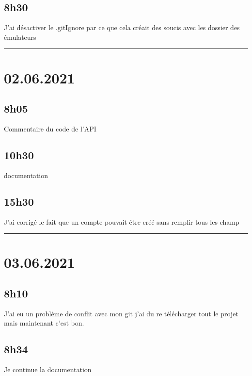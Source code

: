 \documentclass[a4paper,12pt,french]{sphinxmanual}
\begin{document}
\subsection{8h30}
\label{\detokenize{logbook:id181}}
\sphinxAtStartPar
J’ai désactiver le .gitIgnore par ce que cela créait des soucis avec les dossier des émulateurs


\bigskip\hrule\bigskip



\section{02.06.2021}
\label{\detokenize{logbook:id182}}

\subsection{8h05}
\label{\detokenize{logbook:id183}}
\sphinxAtStartPar
Commentaire du code de l’API


\subsection{10h30}
\label{\detokenize{logbook:id184}}
\sphinxAtStartPar
documentation


\subsection{15h30}
\label{\detokenize{logbook:id185}}
\sphinxAtStartPar
J’ai corrigé le fait que un compte pouvait être créé sans remplir tous les champ


\bigskip\hrule\bigskip



\section{03.06.2021}
\label{\detokenize{logbook:id186}}

\subsection{8h10}
\label{\detokenize{logbook:id187}}
\sphinxAtStartPar
J’ai eu un problème de conflit avec mon git j’ai du re télécharger tout le projet mais maintenant c’est bon.


\subsection{8h34}
\label{\detokenize{logbook:h34}}
\sphinxAtStartPar
Je continue la documentation
\end{document}
